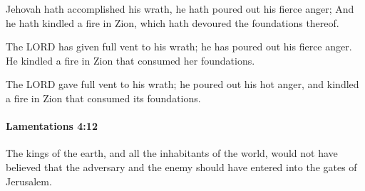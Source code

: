 			\begin{versebox}
					\item[BHS] 
					\item[LXX] 
					\item[ASV] Jehovah hath accomplished his wrath, he hath poured out his fierce anger; And he hath kindled a fire in Zion, which hath devoured the foundations thereof.
					\item[NIV] The LORD has given full vent to his wrath; he has poured out his fierce anger. He kindled a fire in Zion that consumed her foundations.
					\item[NRSV] The LORD gave full vent to his wrath; he poured out his hot anger, and kindled a fire in Zion that consumed its foundations.
			\end{versebox}

		\paragraph{Lamentations 4:12} %
			\label{LAMENTATIONS-4-12}

			The kings of the earth, and all the inhabitants of the world, would not have believed that the adversary and the enemy should have entered into the gates of Jerusalem.

